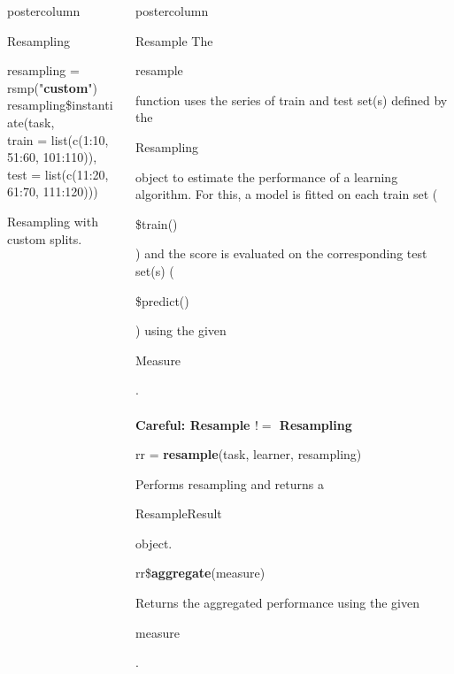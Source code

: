 \documentclass{beamer}
\newlength{\columnheight} %
\newcommand{\codeinline}[1]{\begin{codeboxinline}#1\end{codeboxinline}}
\begin{document}
\begin{withoutheader}
\begin{frame}[fragile]{}
\begin{columns}
\begin{column}{.245\textwidth}
\begin{beamercolorbox}[center]{postercolumn}
\begin{minipage}{.98\textwidth}
{\begin{myblock}{Resampling}
							\\
							\vspace{1em} %
							\begin{codeboxmultiline}[width=27cm]
							resampling = rsmp("\textbf{custom}")\\
							resampling\$instantiate(task,\\
							\hspace*{1ex} train = list(c(1:10, 51:60, 101:110)),\\
							\hspace*{1ex} test = list(c(11:20, 61:70, 111:120)))
							\end{codeboxmultiline}
							Resampling with custom splits.
						\end{myblock}
						\vfill
					}
				\end{minipage}
			\end{beamercolorbox}
		\end{column}
		\begin{column}{.245\textwidth}
			\begin{beamercolorbox}[center]{postercolumn}
				\begin{minipage}{.98\textwidth}
					\parbox[t][\columnheight]{\textwidth}{
						\begin{myblock}{Resample}
							The \codeinline{resample} function uses the series
							of train and test set(s) defined by the
							\codeinline{Resampling} object to estimate the
							performance of a learning algorithm. For this, a
							model is fitted on each train set
							(\codeinline{\$train()}) and the score is evaluated
							on the corresponding test set(s)
							(\codeinline{\$predict()}) using the given
							\codeinline{Measure}.
							\\
							\\
							\textbf{Careful: Resample $!=$ Resampling}
							\vspace{1em}
							\\
							\begin{codebox}
								rr = \textbf{resample}(task, learner, resampling)
							\end{codebox}
							Performs resampling and returns a \codeinline{ResampleResult} object.
							\\
							\vspace{1em}
							\begin{codebox}
								rr\$\textbf{aggregate}(measure)
							\end{codebox}
							Returns the aggregated performance using the given \codeinline{measure}.

\end{myblock}}
\end{minipage}
\end{beamercolorbox}
\end{column}
\end{columns}
\end{frame}
\end{withoutheader}
\end{document}
